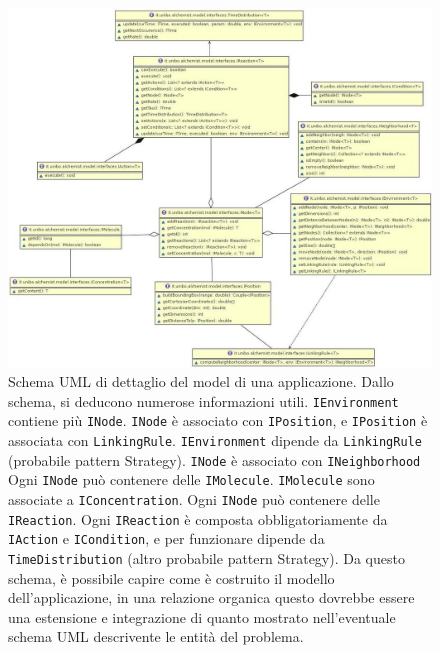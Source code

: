 \documentclass[a4paper,12pt]{report}
\begin{document}
\begin{figure}
\centering{}
\includegraphics[width=\textwidth]{img/goodmodel}
\caption{Schema UML di dettaglio del model di una applicazione.
%
Dallo schema, si deducono numerose informazioni utili.
%
\texttt{IEnvironment} contiene più \texttt{INode}.
%
\texttt{INode} è associato con \texttt{IPosition}, e \texttt{IPosition} è associata con \texttt{LinkingRule}.
%
\texttt{IEnvironment} dipende da \texttt{LinkingRule} (probabile pattern Strategy).
%
\texttt{INode} è associato con \texttt{INeighborhood}
%
Ogni \texttt{INode} può contenere delle \texttt{IMolecule}.
%
\texttt{IMolecule} sono associate a \texttt{IConcentration}.
%
Ogni \texttt{INode} può contenere delle \texttt{IReaction}.
%
Ogni \texttt{IReaction} è composta obbligatoriamente da \texttt{IAction} e \texttt{ICondition}, e per funzionare dipende da \texttt{TimeDistribution} (altro probabile pattern Strategy).
%
Da questo schema, è possibile capire come è costruito il modello dell'applicazione, in una relazione organica questo dovrebbe essere una estensione e integrazione di quanto mostrato nell'eventuale schema UML descrivente le entità del problema.
%
}
\label{img:goodmodel}
\end{figure}
\end{document}
